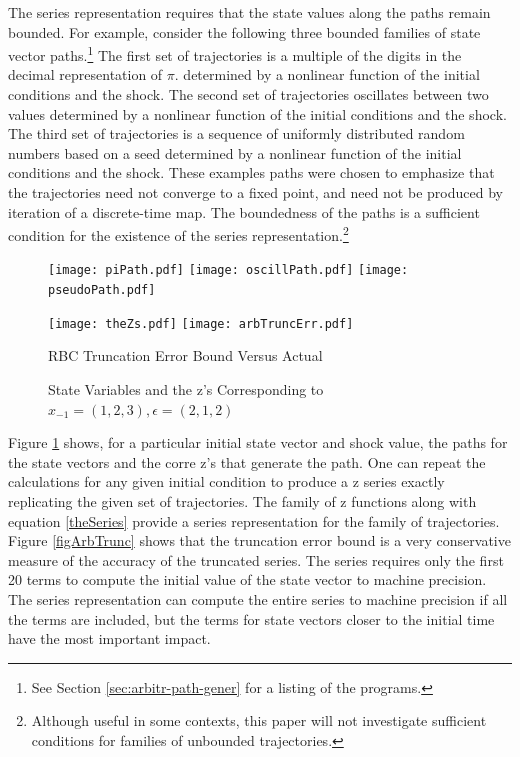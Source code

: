 \documentclass[12pt]{article}
\begin{document}
The series representation requires that the state values along the 
paths remain bounded.  For example, consider the following three
bounded families of state vector paths.\footnote{See Section \ref{sec:arbitr-path-gener}
for a listing of the programs.}
The first set of trajectories is a multiple of
the digits in the decimal representation of $\pi$.  
determined by a nonlinear function of the initial conditions and the shock.
The second set of trajectories oscillates between two values
determined by  a nonlinear function of the initial conditions and the shock.
The third set of trajectories is a sequence of uniformly distributed random
numbers based on a seed determined by  a nonlinear function of  the initial conditions and the shock.
These examples paths were chosen to emphasize that the trajectories
 need not converge to a fixed point, and 
need not be produced by iteration of a discrete-time map.
The boundedness of the paths is a sufficient condition for the existence 
of the series representation.\footnote{Although useful in some contexts,
this paper will not investigate sufficient conditions for families of
unbounded trajectories.}



\begin{figure}
  \centering
\texttt{[image: piPath.pdf]}
\texttt{[image: oscillPath.pdf]}
\texttt{[image: pseudoPath.pdf]}

\texttt{[image: theZs.pdf]}
\texttt{[image: arbTruncErr.pdf]}  
\caption{RBC Truncation Error Bound Versus Actual}
  \caption{State Variables and the  z's Corresponding to  $x_{-1}=(1,2,3),\epsilon=(2,1,2)$} \label{arbFig}
\end{figure}


Figure \ref{arbFig} shows, for a particular initial state vector and shock value,  the paths for the state vectors and the corre z's that generate the path.
One can repeat the calculations for any given initial condition to produce
a z series exactly replicating the given set of trajectories.  The family
of z functions along with equation \ref{theSeries} provide a series 
representation for the family of trajectories.  Figure \ref{figArbTrunc} shows
that the truncation error bound is a very conservative measure of the accuracy
of the truncated series.  The series requires only the first 20 terms to compute
the initial value of the state vector to machine precision. 
The series representation can compute the entire series to machine precision
if all the terms are included, but the terms for state vectors closer 
to the initial time have the most important impact.
\end{document}
